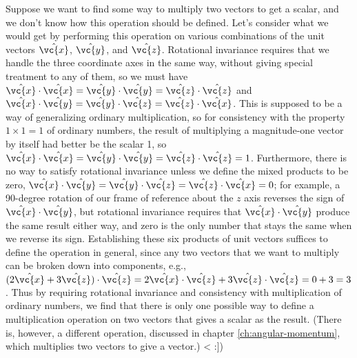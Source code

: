         Suppose we want to find some way to multiply two vectors to get a scalar, and we don't know
        how this operation should be defined. Let's consider what we would get
        by performing this operation on various combinations of the unit vectors
        $\hat{\vc{x}}$, $\hat{\vc{y}}$, and $\hat{\vc{z}}$.
        Rotational invariance requires that we handle the three coordinate axes
        in the same way, without giving special treatment to any of them, so we must
        have $\hat{\vc{x}}\cdot\hat{\vc{x}}=\hat{\vc{y}}\cdot\hat{\vc{y}}=\hat{\vc{z}}\cdot\hat{\vc{z}}$
        and $\hat{\vc{x}}\cdot\hat{\vc{y}}=\hat{\vc{y}}\cdot\hat{\vc{z}}=\hat{\vc{z}}\cdot\hat{\vc{x}}$.
        This is supposed to be a way of generalizing ordinary multiplication, so for consistency
        with the property $1\times1=1$ of ordinary numbers, the result
        of multiplying a magnitude-one vector by itself had better be the scalar 1, so
        $\hat{\vc{x}}\cdot\hat{\vc{x}}=\hat{\vc{y}}\cdot\hat{\vc{y}}=\hat{\vc{z}}\cdot\hat{\vc{z}}=1$.
        Furthermore, there is no way to satisfy rotational invariance unless we define the mixed
        products to be zero,
        $\hat{\vc{x}}\cdot\hat{\vc{y}}=\hat{\vc{y}}\cdot\hat{\vc{z}}=\hat{\vc{z}}\cdot\hat{\vc{x}}=0$;
        for example, a 90-degree rotation of our frame of reference about the $z$ axis
        reverses the sign of $\hat{\vc{x}}\cdot\hat{\vc{y}}$, but rotational invariance requires
        that $\hat{\vc{x}}\cdot\hat{\vc{y}}$ produce the same result either way, and zero is the
        only number that stays the same when we reverse its sign. Establishing these six
        products of unit vectors suffices to define the operation in general, since any
        two vectors that we want to multiply can be broken down into components, e.g.,
        $(2\hat{\vc{x}}+3\hat{\vc{z}})\cdot\hat{\vc{z}}
        =2\hat{\vc{x}}\cdot\hat{\vc{z}}+3\hat{\vc{z}}\cdot\hat{\vc{z}}=0+3=3$. Thus by
        requiring rotational invariance and consistency with multiplication of ordinary
        numbers, we find that there is only one possible way to define a multiplication
        operation on two vectors that gives a scalar as the result. (There is, however,
        a different operation, discussed in chapter \ref{ch:angular-momentum}, which multiplies two vectors
        to give a vector.)
<%
:])
